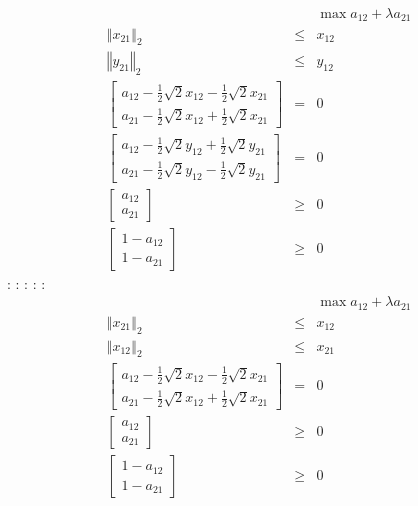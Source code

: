 \documentclass{article}
\begin{document}
\begin{eqnarray*}
&&\max a_{12}+\lambda a_{21} \\
\left\Vert x_{21}\right\Vert _{2} &\leq &x_{12} \\
\left\Vert y_{21}\right\Vert _{2} &\leq &y_{12} \\
\left[ 
\begin{array}{c}
a_{12}-\frac{1}{2}\sqrt{2}x_{12}-\frac{1}{2}\sqrt{2}x_{21} \\ 
a_{21}-\frac{1}{2}\sqrt{2}x_{12}+\frac{1}{2}\sqrt{2}x_{21}%
\end{array}%
\right]  &=&0 \\
\left[ 
\begin{array}{c}
a_{12}-\frac{1}{2}\sqrt{2}y_{12}+\frac{1}{2}\sqrt{2}y_{21} \\ 
a_{21}-\frac{1}{2}\sqrt{2}y_{12}-\frac{1}{2}\sqrt{2}y_{21}%
\end{array}%
\right]  &=&0 \\
\left[ 
\begin{array}{c}
a_{12} \\ 
a_{21}%
\end{array}%
\right]  &\geq &0 \\
\left[ 
\begin{array}{c}
1-a_{12} \\ 
1-a_{21}%
\end{array}%
\right]  &\geq &0
\end{eqnarray*}
:  :  :  :  : 
\begin{eqnarray*}
&&\max a_{12}+\lambda a_{21} \\
\left\Vert x_{21}\right\Vert _{2} &\leq &x_{12} \\
\left\Vert x_{12}\right\Vert _{2} &\leq &x_{21} \\
\left[ 
\begin{array}{c}
a_{12}-\frac{1}{2}\sqrt{2}x_{12}-\frac{1}{2}\sqrt{2}x_{21} \\ 
a_{21}-\frac{1}{2}\sqrt{2}x_{12}+\frac{1}{2}\sqrt{2}x_{21}%
\end{array}%
\right]  &=&0 \\
\left[ 
\begin{array}{c}
a_{12} \\ 
a_{21}%
\end{array}%
\right]  &\geq &0 \\
\left[ 
\begin{array}{c}
1-a_{12} \\ 
1-a_{21}%
\end{array}%
\right]  &\geq &0
\end{eqnarray*}%
\end{document}
